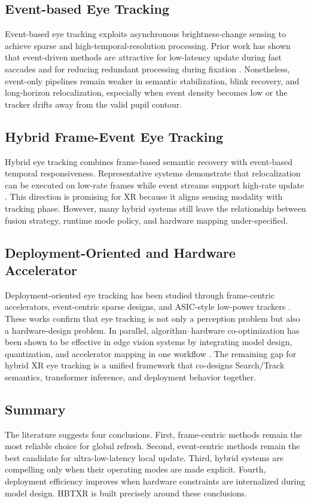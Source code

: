 \documentclass[journal]{IEEEtran}
\begin{document}
\subsection{Event-based Eye Tracking}
Event-based eye tracking exploits asynchronous brightness-change sensing to achieve sparse and high-temporal-resolution processing. Prior work has shown that event-driven methods are attractive for low-latency update during fast saccades and for reducing redundant processing during fixation \cite{ref4,ref5,ref6}. Nonetheless, event-only pipelines remain weaker in semantic stabilization, blink recovery, and long-horizon relocalization, especially when event density becomes low or the tracker drifts away from the valid pupil contour.

\subsection{Hybrid Frame-Event Eye Tracking}
Hybrid eye tracking combines frame-based semantic recovery with event-based temporal responsiveness. Representative systems demonstrate that relocalization can be executed on low-rate frames while event streams support high-rate update \cite{ref7}. This direction is promising for XR because it aligns sensing modality with tracking phase. However, many hybrid systems still leave the relationship between fusion strategy, runtime mode policy, and hardware mapping under-specified.

\subsection{Deployment-Oriented and Hardware Accelerator}
Deployment-oriented eye tracking has been studied through frame-centric accelerators, event-centric sparse designs, and ASIC-style low-power trackers \cite{ref8,ref9,ref10}. These works confirm that eye tracking is not only a perception problem but also a hardware-design problem. In parallel, algorithm--hardware co-optimization has been shown to be effective in edge vision systems by integrating model design, quantization, and accelerator mapping in one workflow \cite{ref12}. The remaining gap for hybrid XR eye tracking is a unified framework that co-designs Search/Track semantics, transformer inference, and deployment behavior together.

\subsection{Summary}
The literature suggests four conclusions. First, frame-centric methods remain the most reliable choice for global refresh. Second, event-centric methods remain the best candidate for ultra-low-latency local update. Third, hybrid systems are compelling only when their operating modes are made explicit. Fourth, deployment efficiency improves when hardware constraints are internalized during model design. HBTXR is built precisely around these conclusions.
\end{document}
